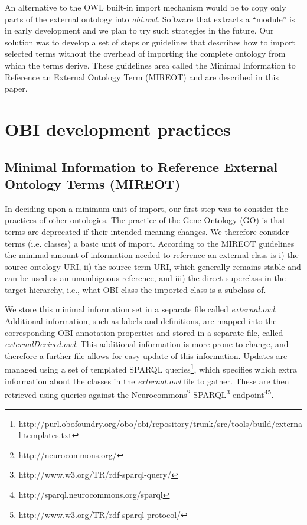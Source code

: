\documentclass{elsart}       %
\begin{document}
An alternative to the OWL built-in import mechanism would be to copy only parts of the external ontology into \emph{obi.owl}. Software that extracts a ``module''\cite{module} is in early development and we plan to try such strategies in the future.
Our solution was to develop a set of steps or guidelines that describes how to import selected terms without the overhead of importing the complete ontology from which the terms derive.
These guidelines area called the Minimal Information to Reference an External Ontology Term (MIREOT) and are described in this paper.

\section{OBI development practices}


\subsection{Minimal Information to Reference External Ontology Terms (MIREOT)}

In deciding upon a minimum unit of import, our first step was to consider the practices of other ontologies.
The practice of the Gene Ontology (GO)\cite{go} is that terms are deprecated if their intended meaning changes\cite{deprecated}.
We therefore consider terms (i.e. classes) a basic unit of import.
According to the MIREOT guidelines the minimal amount of information needed to reference an external class is i) the source ontology URI, ii) the source term URI, which generally remains stable and can be used as an unambiguous reference, and iii) the direct superclass in the target hierarchy, i.e., what OBI class the imported class is a subclass of.

We store this minimal information set in a separate file called \emph{external.owl}. 
Additional information, such as labels and definitions, are mapped into the corresponding OBI annotation properties and stored in a separate file, called \emph{externalDerived.owl}. This additional information is more prone to change, and therefore a further file allows for easy update of this information.
Updates are managed using a set of templated SPARQL queries\footnote{http://purl.obofoundry.org/obo/obi/repository/trunk/src/tools/build/external-templates.txt}, which specifies which extra information about the classes in the \emph{external.owl} file to gather.
These are then retrieved using queries against the Neurocommons\footnote{http://neurocommons.org/} SPARQL\footnote{http://www.w3.org/TR/rdf-sparql-query/} endpoint\footnote{http://sparql.neurocommons.org/sparql}\footnote{http://www.w3.org/TR/rdf-sparql-protocol/}. 
\end{document}
